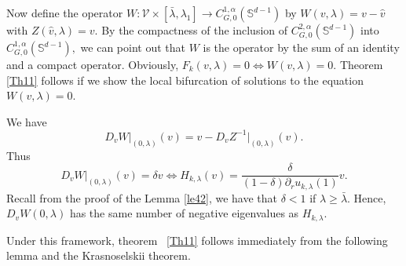 \documentclass[reqno]{amsart}
\def\S{\mathbb S}
\numberwithin{equation}{section}
\newenvironment{key words}{\textbf{Keywords}\mbox{  }}{ }
\begin{document}
     Now define the operator $W:\mathcal{V}\times[\bar{\lambda},\lambda_{1}] \rightarrow C^{1,\alpha}_{G,0}(\S ^{d-1})$ by $W(v,\lambda)=v-\hat{v}$ with $Z(\hat{v},\lambda)=v.$ By the compactness of the inclusion of $ C^{2,\alpha}_{G,0}(\S ^{d-1})$ into $C^{1,\alpha}_{G,0}(\S ^{d-1}),$ we can point out that $W$ is the operator by the sum of an identity and a compact operator. Obviously, $F_k(v,\lambda)=0\Leftrightarrow W(v,\lambda)=0.$ Theorem \ref{Th11} follows if we show the local bifurcation of solutions to the equation $W(v,\lambda)=0.$

     We have
     \[D_{v}W\big|_{(0,\lambda)}(v)=v-D_{v}Z^{-1}\big|_{(0,\lambda)}(v).\]
     Thus
     \[D_{v}W\big|_{(0,\lambda)}(v)=\delta v\Leftrightarrow H_{k, \lambda}(v)=\frac{\delta}{(1-\delta)\partial_r u_{k,\lambda}(1)}v.\]
    Recall from the proof of the Lemma \ref{le42}, we have that $\delta<1$ if $\lambda\geq\bar{\lambda}$. Hence, $D_{v}W(0,\lambda)$ has the same number of negative eigenvalues as $H_{k, \lambda}.$

Under this framework, theorem ~\ref{Th11} follows immediately from the following lemma and the Krasnoselskii theorem.
\end{document}

